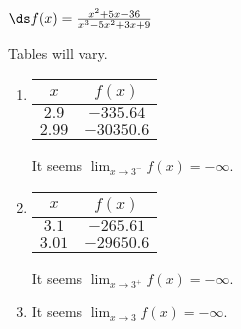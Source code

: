 {$\ds f(x)= \frac{x^2+5 x-36}{x^3-5 x^2+3 x+9}$
}
{Tables will vary.
\begin{enumerate}
\item	
\begin{tabular}{cc}
$x$ & $f(x)$ \\ \hline
$2.9$ & $-335.64$ \\
 $2.99$ & $-30350.6$ \\
  \end{tabular}
 It seems $\lim_{x\to3^-}f(x) =-\infty$.
\item
\begin{tabular}{cc}
$x$ & $f(x)$ \\ \hline
$ 3.1$ & $-265.61$ \\
 $3.01$ & $-29650.6$ \\
  \end{tabular}
  It seems $\lim_{x\to3^+}f(x) =-\infty$.
\item		It seems $\lim_{x\to3}f(x) =-\infty$.
\end{enumerate}
}
